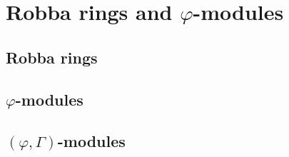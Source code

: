 \section{Robba rings and \texorpdfstring{$\varphi$}{}-modules}
    \subsection{Robba rings}
    
    \subsection{\texorpdfstring{$\varphi$}{}-modules}

    \subsection{\texorpdfstring{$(\varphi, \Gamma)$}{}-modules}
